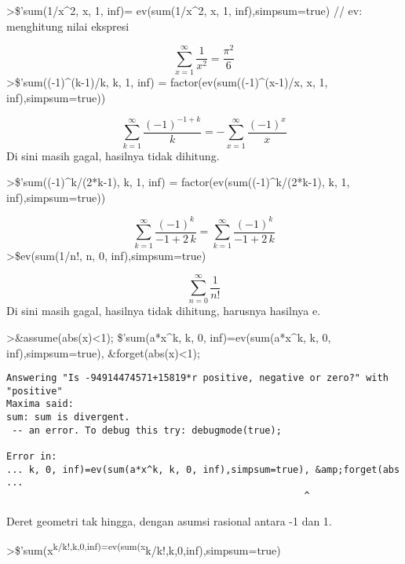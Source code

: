\documentclass[
]{book}
\begin{document}
\textgreater\$'sum(1/x\^{}2, x, 1, inf)= ev(sum(1/x\^{}2, x, 1, inf),simpsum=true) // ev: menghitung nilai ekspresi

\[\sum_{x=1}^{\infty }{\frac{1}{x^2}}=\frac{\pi^2}{6}\]\textgreater\$'sum((-1)\^{}(k-1)/k, k, 1, inf) = factor(ev(sum((-1)\^{}(x-1)/x, x, 1, inf),simpsum=true))

\[\sum_{k=1}^{\infty }{\frac{\left(-1\right)^{-1+k}}{k}}=-\sum_{x=1
 }^{\infty }{\frac{\left(-1\right)^{x}}{x}}\]Di sini masih gagal, hasilnya tidak dihitung.

\textgreater\$'sum((-1)\^{}k/(2*k-1), k, 1, inf) = factor(ev(sum((-1)\^{}k/(2*k-1), k, 1, inf),simpsum=true))

\[\sum_{k=1}^{\infty }{\frac{\left(-1\right)^{k}}{-1+2\,k}}=\sum_{k=1
 }^{\infty }{\frac{\left(-1\right)^{k}}{-1+2\,k}}\]\textgreater\$ev(sum(1/n!, n, 0, inf),simpsum=true)

\[\sum_{n=0}^{\infty }{\frac{1}{n!}}\]Di sini masih gagal, hasilnya tidak dihitung, harusnya hasilnya e.

\textgreater\&assume(abs(x)\textless1); \$'sum(a*x\^{}k, k, 0, inf)=ev(sum(a*x\^{}k, k, 0, inf),simpsum=true), \&forget(abs(x)\textless1);

\begin{verbatim}
Answering "Is -94914474571+15819*r positive, negative or zero?" with "positive"
Maxima said:
sum: sum is divergent.
 -- an error. To debug this try: debugmode(true);

Error in:
... k, 0, inf)=ev(sum(a*x^k, k, 0, inf),simpsum=true), &amp;forget(abs ...
                                                     ^
\end{verbatim}

Deret geometri tak hingga, dengan asumsi rasional antara -1 dan 1.

\textgreater\$'sum(x\textsuperscript{k/k!,k,0,inf)=ev(sum(x}k/k!,k,0,inf),simpsum=true)
\end{document}
